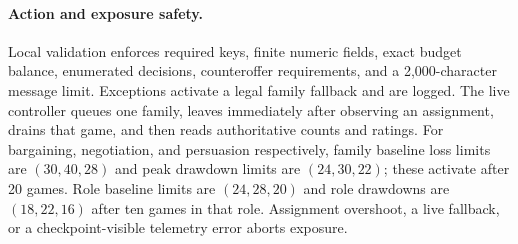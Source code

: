 \paragraph{Action and exposure safety.}
Local validation enforces required keys, finite numeric fields, exact budget
balance, enumerated decisions, counteroffer requirements, and a 2,000-character
message limit. Exceptions activate a legal family fallback and are logged. The
live controller queues one family, leaves immediately after observing an
assignment, drains that game, and then reads authoritative counts and ratings.
For bargaining, negotiation, and persuasion respectively, family baseline loss
limits are $(30,40,28)$ and peak drawdown limits are $(24,30,22)$; these activate
after 20 games. Role baseline limits are $(24,28,20)$ and role drawdowns are
$(18,22,16)$ after ten games in that role. Assignment overshoot, a live fallback,
or a checkpoint-visible telemetry error aborts exposure.
